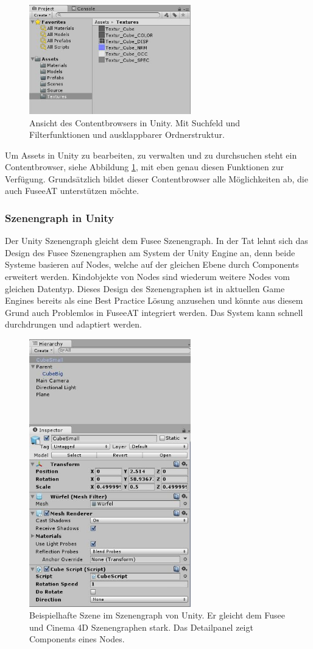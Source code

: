 \documentclass[pagesize, paper=a4, fontsize=12pt, titlepage=true, headings=small, headnosepline, abstractoff, liststotoc, nochapterprefix, plainheadsepline, twoside]{scrreprt}
\begin{document}
\begin{figure}[ht]
	\centering
	\includegraphics[width=7cm]{Bilder/uContentbrowser.jpg}
	\caption{Ansicht des Contentbrowsers in Unity. Mit Suchfeld und Filterfunktionen und ausklappbarer Ordnerstruktur.}
	\label{UnityContentbrowser}
\end{figure}
Um Assets in Unity zu bearbeiten, zu verwalten und zu durchsuchen steht ein Contentbrowser, siehe Abbildung \ref{UnityContentbrowser}, mit eben genau diesen Funktionen zur Verfügung. Grundsätzlich bildet dieser Contentbrowser alle Möglichkeiten ab, die auch FuseeAT unterstützen möchte.

\subsubsection{Szenengraph in Unity}
Der Unity Szenengraph gleicht dem Fusee Szenengraph. In der Tat lehnt sich das Design des Fusee Szenengraphen am System der Unity Engine an, denn beide Systeme basieren auf Nodes, welche auf der gleichen Ebene durch Components erweitert werden. Kindobjekte von Nodes sind wiederum weitere Nodes vom gleichen Datentyp. Dieses Design des Szenengraphen ist in aktuellen Game Engines bereits als eine Best Practice Lösung anzusehen und könnte aus diesem Grund auch Problemlos in FuseeAT integriert werden. Das System kann schnell durchdrungen und adaptiert werden.
\begin{figure}[ht]
	\centering
	\includegraphics[width=7cm]{Bilder/uSzeneGraphDetails.jpg}
	\caption{Beispielhafte Szene im Szenengraph von Unity. Er gleicht dem Fusee und Cinema 4D Szenengraphen stark. Das Detailpanel zeigt Components eines Nodes.}
	\label{UnitySzenengraph}
\end{figure}
\end{document}
